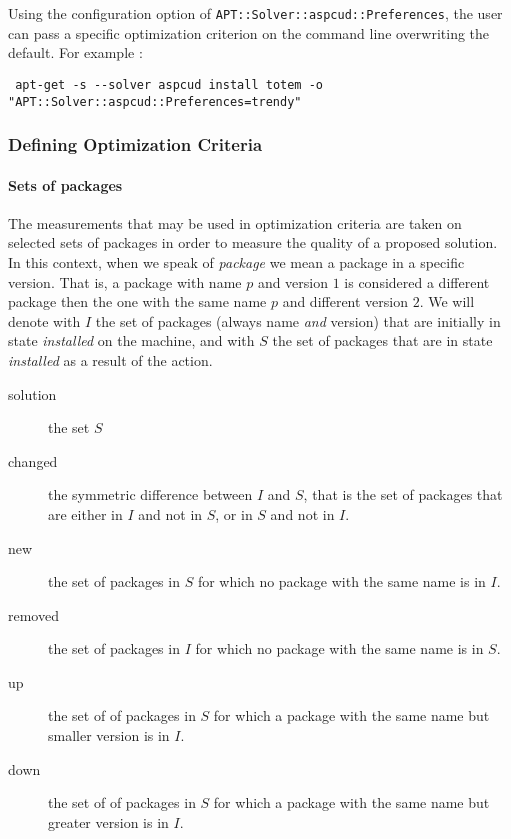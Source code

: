 Using the configuration option of \aptget{}
\texttt{APT::Solver::aspcud::Preferences}, the user can pass a
specific optimization criterion on the command line overwriting the
default. For example :

\begin{verbatim}
 apt-get -s --solver aspcud install totem -o "APT::Solver::aspcud::Preferences=trendy"
\end{verbatim}

\subsubsection{Defining Optimization Criteria}
\label{sec:defining:criteria}

\paragraph{Sets of packages}
The measurements that may be used in optimization criteria are taken
on selected sets of packages in order to measure the quality of a
proposed solution. In this context, when we speak of \textit{package}
we mean a package in a specific version. That is, a package with name
$p$ and version $1$ is considered a different package then the one
with the same name $p$ and different version $2$. We will denote with $I$
the set of packages (always name \emph{and} version) that are initially in
state \textit{installed} on the machine, and with $S$ the set of packages
that are in state \textit{installed} as a result of the \aptget{} action.

\begin{description}
\item[solution] the set $S$
\item[changed] the symmetric difference between $I$ and $S$, that is the set
  of packages that are either in $I$ and not in $S$, or in $S$ and not in $I$.
\item[new] the set of packages in $S$ for which no package with the same
  name is in $I$.
\item[removed] the set of packages in $I$ for which no package with the same
  name is in $S$.
\item[up] the set of of packages in $S$ for which a package with the same name
  but smaller version is in $I$.
\item[down] the set of of packages in $S$ for which a package with the same name
  but greater version is in $I$.
\end{description}

